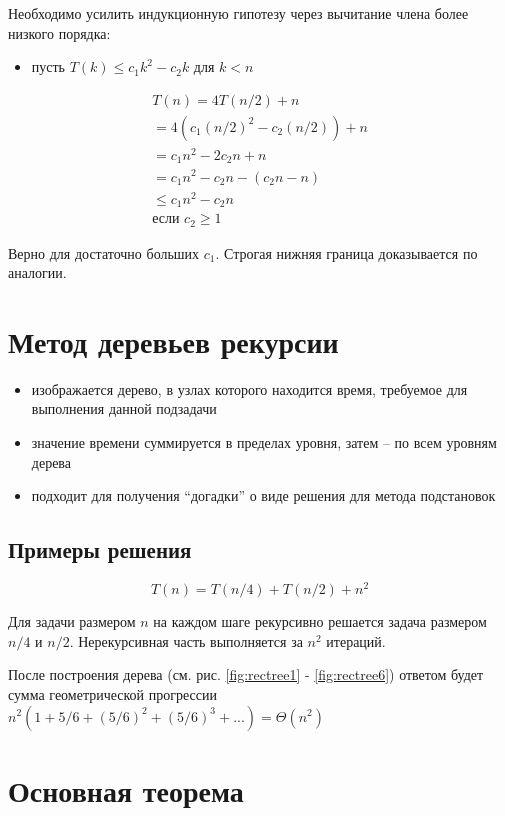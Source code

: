 \documentclass[a4paper,11pt]{article}
\begin{document}
Необходимо усилить индукционную гипотезу через вычитание члена более низкого 
порядка:
\begin{itemize}
\item пусть $T(k) \leqslant c_1 k^2 - c_2 k$ для $k < n$
\end{itemize}
\begin{align*}
  T(n) = 4T(n/2) + n \\
  = 4(c_1(n/2)^2 - c_2(n/2)) + n \\
  = c_1 n^2 - 2c_2 n + n \\
  = c_1 n^2 - c_2 n - (c_2 n - n) \\
  \leqslant c_1 n^2 - c_2 n \\
  \text{если } c_2 \geqslant 1
\end{align*}

Верно для достаточно больших $c_1$. Строгая нижняя граница доказывается по
аналогии.
\section{Метод деревьев рекурсии}
\begin{itemize}
\item изображается дерево, в узлах которого находится время, требуемое для
  выполнения данной подзадачи
\item значение времени суммируется в пределах уровня, затем -- по всем
  уровням дерева
\item подходит для получения ``догадки'' о виде решения для метода подстановок
\end{itemize}

\subsection{Примеры решения}
\begin{equation*}
  T(n) = T(n/4) + T(n/2) + n^2 
\end{equation*}

Для задачи размером $n$ на каждом шаге рекурсивно решается задача размером
$n/4$ и $n/2$. Нерекурсивная часть выполняется за $n^2$ итераций.

После построения дерева (см. рис. \ref{fig:rectree1} - \ref{fig:rectree6})
ответом будет сумма геометрической прогрессии
$n^2(1+5/6 + (5/6)^2 + (5/6)^3 + ...) = \Theta(n^2)$

\section{Основная теорема}
\end{document}
